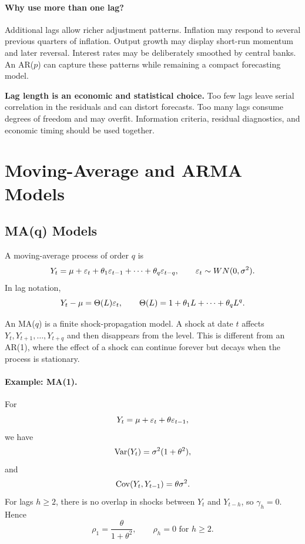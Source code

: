 \paragraph{Why use more than one lag?}
Additional lags allow richer adjustment patterns. Inflation may respond to several previous quarters of inflation. Output growth may display short-run momentum and later reversal. Interest rates may be deliberately smoothed by central banks. An AR($p$) can capture these patterns while remaining a compact forecasting model.

\begin{boxD}
\textbf{Lag length is an economic and statistical choice.}
Too few lags leave serial correlation in the residuals and can distort forecasts. Too many lags consume degrees of freedom and may overfit. Information criteria, residual diagnostics, and economic timing should be used together.
\end{boxD}

\section{Moving-Average and ARMA Models}

\subsection{MA(q) Models}
A moving-average process of order $q$ is
\begin{equation}
Y_t=\mu+\varepsilon_t+\theta_1\varepsilon_{t-1}+\cdots+\theta_q\varepsilon_{t-q},
\qquad
\varepsilon_t\sim WN(0,\sigma^2).
\label{eq:maq}
\end{equation}
In lag notation,
\[
Y_t-\mu=\Theta(L)\varepsilon_t,
\qquad
\Theta(L)=1+\theta_1L+\cdots+\theta_qL^q.
\]

An MA($q$) is a finite shock-propagation model. A shock at date $t$ affects $Y_t,Y_{t+1},\ldots,Y_{t+q}$ and then disappears from the level. This is different from an AR(1), where the effect of a shock can continue forever but decays when the process is stationary.

\paragraph{Example: MA(1).}
For
\[
Y_t=\mu+\varepsilon_t+\theta\varepsilon_{t-1},
\]
we have
\[
\operatorname{Var}(Y_t)=\sigma^2(1+\theta^2),
\]
and
\[
\operatorname{Cov}(Y_t,Y_{t-1})=\theta\sigma^2.
\]
For lags $h\geq 2$, there is no overlap in shocks between $Y_t$ and $Y_{t-h}$, so $\gamma_h=0$. Hence
\[
\rho_1=\frac{\theta}{1+\theta^2},
\qquad
\rho_h=0\text{ for }h\geq 2.
\]

